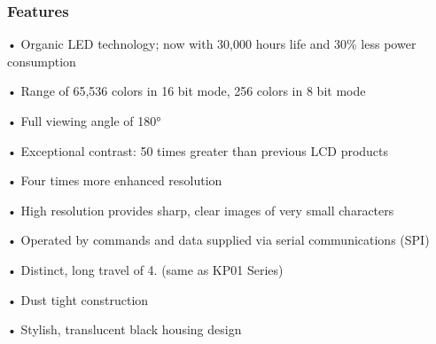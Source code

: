 \subsubsection*{Features }

\begin{DoxyParagraph}{}

\end{DoxyParagraph}
• Organic L\+E\+D technology; now with 30,000 hours life and 30\% less power consumption

• Range of 65,536 colors in 16 bit mode, 256 colors in 8 bit mode

• Full viewing angle of 180°

• Exceptional contrast\+: 50 times greater than previous L\+C\+D products

• Four times more enhanced resolution

• High resolution provides sharp, clear images of very small characters

• Operated by commands and data supplied via serial communications (S\+P\+I)

• Distinct, long travel of 4.\+5mm (same as K\+P01 Series)

• Dust tight construction

• Stylish, translucent black housing design 